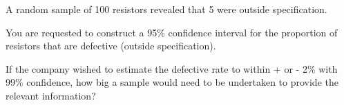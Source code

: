 
A random sample of 100 resistors revealed that 5 were outside specification.  

You are requested to construct a 95\% confidence interval for the proportion of resistors that are defective (outside specification).
 
If the company wished to estimate the defective rate to within + or - 2\% with 99\% confidence, how big a sample would need to be undertaken to provide the relevant information?

 

